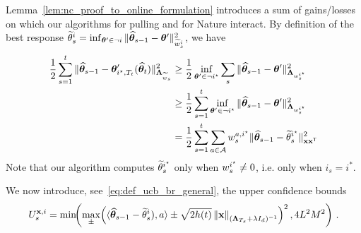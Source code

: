 Lemma~\ref{lem:nc_proof_to_online_formulation} introduces a sum of gains/losses on which our algorithms for pulling and for Nature interact.
By definition of the best response $\widetilde{\bf \theta}_s^i = \inf_{{\boldsymbol \theta}' \in \neg i} \Vert \widehat{{\boldsymbol \theta}}_{s-1} - {\boldsymbol \theta}' \Vert_{\widetilde{w}_s^i}^2$, we have
\begin{align}
\frac{1}{2}\sum_{s=1}^t  \Vert \widehat{{\boldsymbol \theta}}_{s-1} - {\boldsymbol \theta}'_{i^\star,T_t}(\widehat{{\boldsymbol \theta}}_t)\Vert_{{\boldsymbol \Lambda}_{\widetilde{w}_s}}^2
&\ge \frac{1}{2} \inf_{{\boldsymbol \theta}' \in \neg i^\star} \sum_s \Vert \widehat{{\boldsymbol \theta}}_{s-1} - {\boldsymbol \theta}'\Vert_{{\boldsymbol \Lambda}_{w_s^{i^\star}}}^2
\nonumber\\
&\geq \frac{1}{2}\sum_{s=1}^t \inf_{{\boldsymbol \theta}' \in \neg i^\star} \Vert \widehat{{\boldsymbol \theta}}_{s-1} - {\boldsymbol \theta}'\Vert_{{\boldsymbol \Lambda}_{w_s^{i^\star}}}^2
\nonumber\\
&= \frac{1}{2}\sum_{s=1}^t \sum_{a\in\mathcal{A}} w_s^{a,i^\star}\Vert \widehat{{\boldsymbol \theta}}_{s-1} - \widetilde{\bf \theta}_s^{i^\star}\Vert_{{\bf x}{\bf x}^\mathsf{\scriptscriptstyle T}}^2\label{eq:only_istar}
\end{align}
Note that our algorithm computes $\widetilde{\bf \theta}_s^{i^\star}$ only when $w_s^{i^\star} \neq 0$, i.e. only when $i_s = i^*$.

We now introduce, see~\eqref{eq:def_ucb_br_general}, the upper confidence bounds
\[
    U_s^{{\bf x},i} = \min\!\!\left(\max_\pm\! \left( \langle \widehat{{\boldsymbol \theta}}_{s-1} - \widetilde{\bf \theta}^{i}_s), a\rangle \pm \sqrt{2 h(t)} \left\lVert{\bf x}\right\rVert_{({\boldsymbol \Lambda}_{T_s}+\lambda I_d)^{-1} } \right)^2,4L^2M^2\right)\,.
\]

